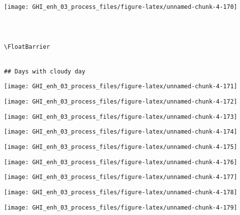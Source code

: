 \documentclass[
  10pt,
  a4paper,oneside]{article}
\begin{document}
\begin{center}\texttt{[image: GHI\_enh\_03\_process\_files/figure-latex/unnamed-chunk-4-170]} \end{center}

\begin{verbatim}
 
 

\FloatBarrier


## Days with cloudy day 
\end{verbatim}

\begin{center}\texttt{[image: GHI\_enh\_03\_process\_files/figure-latex/unnamed-chunk-4-171]} \end{center}

\begin{center}\texttt{[image: GHI\_enh\_03\_process\_files/figure-latex/unnamed-chunk-4-172]} \end{center}

\begin{center}\texttt{[image: GHI\_enh\_03\_process\_files/figure-latex/unnamed-chunk-4-173]} \end{center}

\begin{center}\texttt{[image: GHI\_enh\_03\_process\_files/figure-latex/unnamed-chunk-4-174]} \end{center}

\begin{center}\texttt{[image: GHI\_enh\_03\_process\_files/figure-latex/unnamed-chunk-4-175]} \end{center}

\begin{center}\texttt{[image: GHI\_enh\_03\_process\_files/figure-latex/unnamed-chunk-4-176]} \end{center}

\begin{center}\texttt{[image: GHI\_enh\_03\_process\_files/figure-latex/unnamed-chunk-4-177]} \end{center}

\begin{center}\texttt{[image: GHI\_enh\_03\_process\_files/figure-latex/unnamed-chunk-4-178]} \end{center}

\begin{center}\texttt{[image: GHI\_enh\_03\_process\_files/figure-latex/unnamed-chunk-4-179]} \end{center}
\end{document}
